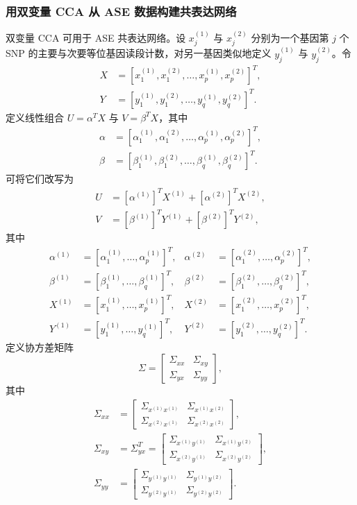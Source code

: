 \subsubsection{用双变量 CCA 从 ASE 数据构建共表达网络}
双变量 CCA 可用于 ASE 共表达网络。设 $x_j^{(1)}$ 与 $x_j^{(2)}$ 分别为一个基因第 $j$ 个 SNP 的主要与次要等位基因读段计数，对另一基因类似地定义 $y_j^{(1)}$ 与 $y_j^{(2)}$。令
\[
\begin{aligned}
X&=[x_1^{(1)},x_1^{(2)},\ldots,x_p^{(1)},x_p^{(2)}]^T,\\
Y&=[y_1^{(1)},y_1^{(2)},\ldots,y_q^{(1)},y_q^{(2)}]^T.
\end{aligned}
\]
定义线性组合 $U=\alpha^TX$ 与 $V=\beta^TX$，其中
\[
\begin{aligned}
\alpha&=[\alpha_1^{(1)},\alpha_1^{(2)},\ldots,\alpha_p^{(1)},\alpha_p^{(2)}]^T,\\
\beta&=[\beta_1^{(1)},\beta_1^{(2)},\ldots,\beta_q^{(1)},\beta_q^{(2)}]^T.
\end{aligned}
\]
可将它们改写为
\[
\begin{aligned}
U&=[\alpha^{(1)}]^TX^{(1)}+[\alpha^{(2)}]^TX^{(2)},\\
V&=[\beta^{(1)}]^TY^{(1)}+[\beta^{(2)}]^TY^{(2)},
\end{aligned}
\]
其中
\[
\begin{aligned}
\alpha^{(1)}&=[\alpha_1^{(1)},\ldots,\alpha_p^{(1)}]^T,&
\alpha^{(2)}&=[\alpha_1^{(2)},\ldots,\alpha_p^{(2)}]^T,\\
\beta^{(1)}&=[\beta_1^{(1)},\ldots,\beta_q^{(1)}]^T,&
\beta^{(2)}&=[\beta_1^{(2)},\ldots,\beta_q^{(2)}]^T,\\
X^{(1)}&=[x_1^{(1)},\ldots,x_p^{(1)}]^T,&
X^{(2)}&=[x_1^{(2)},\ldots,x_p^{(2)}]^T,\\
Y^{(1)}&=[y_1^{(1)},\ldots,y_q^{(1)}]^T,&
Y^{(2)}&=[y_1^{(2)},\ldots,y_q^{(2)}]^T.
\end{aligned}
\]
定义协方差矩阵
\[
\Sigma=\begin{bmatrix}\Sigma_{xx}&\Sigma_{xy}\\\Sigma_{yx}&\Sigma_{yy}\end{bmatrix},
\]
其中
\[
\begin{aligned}
\Sigma_{xx}&=\begin{bmatrix}\Sigma_{x^{(1)}x^{(1)}}&\Sigma_{x^{(1)}x^{(2)}}\\\Sigma_{x^{(2)}x^{(1)}}&\Sigma_{x^{(2)}x^{(2)}}\end{bmatrix},\\
\Sigma_{xy}&=\Sigma_{yx}^T=\begin{bmatrix}\Sigma_{x^{(1)}y^{(1)}}&\Sigma_{x^{(1)}y^{(2)}}\\\Sigma_{x^{(2)}y^{(1)}}&\Sigma_{x^{(2)}y^{(2)}}\end{bmatrix},\\
\Sigma_{yy}&=\begin{bmatrix}\Sigma_{y^{(1)}y^{(1)}}&\Sigma_{y^{(1)}y^{(2)}}\\\Sigma_{y^{(2)}y^{(1)}}&\Sigma_{y^{(2)}y^{(2)}}\end{bmatrix}.
\end{aligned}
\]
